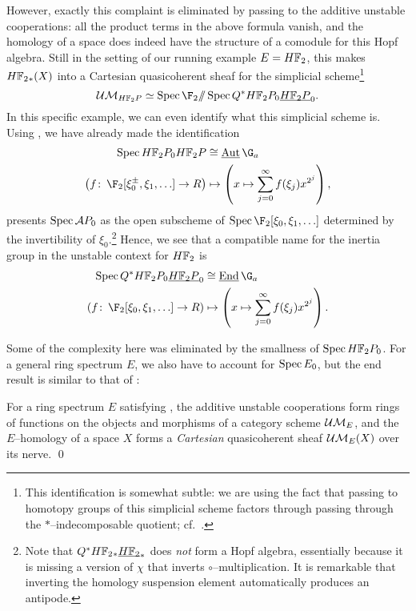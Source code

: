 However, exactly this complaint is eliminated by passing to the additive unstable cooperations: all the product terms in the above formula vanish, and the homology of a space does indeed have the structure of a comodule for this Hopf algebra.  Still in the setting of our running example \(E = \HFtwo\), this makes \(\HFtwo_*(X)\) into a Cartesian quasicoherent sheaf for the simplicial scheme\footnote{This identification is somewhat subtle: we are using the fact that passing to homotopy groups of this simplicial scheme factors through passing through the \(\ast\)--indecomposable quotient; cf.\ .} \[\Ucontext{\HFtwo P} \simeq \Spec \F_2 \mmod \Spec Q^* \HFtwo P_0 \OS{\HFtwo P}{0}.\]  In this specific example, we can even identify what this simplicial scheme is.  Using , we have already made the identification
\begin{align*}
\Spec \HFtwo P_0 \HFtwo P & \cong \InternalAut{\G_a} \\
\left(f\co \F_2[\xi_0^\pm, \xi_1, \ldots] \to R \right) & \mapsto \left(x \mapsto \sum_{j=0}^\infty f(\xi_j) x^{2^j}\right),
\end{align*}
 presents \(\operatorname{Spec} \mathcal A P_0\) as the open subscheme of \(\Spec \F_2[\xi_0, \xi_1, \ldots]\) determined by the invertibility of \(\xi_0\).\footnote{Note that \(Q^* \HFtwo_* \OS{\HFtwo}{*}\) does \emph{not} form a Hopf algebra, essentially because it is missing a version of \(\chi\) that inverts \(\circ\)--multiplication.  It is remarkable that inverting the homology suspension element automatically produces an antipode.}  Hence, we see that a compatible name for the inertia group in the unstable context for \(\HFtwo\) is
\begin{align*}
\Spec Q^* \HFtwo P_0 \OS{\HFtwo P}{0} & \cong \InternalEnd{\G_a} \\
\left(f\co \F_2[\xi_0, \xi_1, \ldots] \to R \right) & \mapsto \left(x \mapsto \sum_{j=0}^\infty f(\xi_j) x^{2^j}\right).
\end{align*}

Some of the complexity here was eliminated by the smallness of \(\Spec \HFtwo P_0\).  For a general ring spectrum \(E\), we also have to account for \(\operatorname{Spec} E_0\), but the end result is similar to that of :
\begin{lemma}
For a ring spectrum \(E\) satisfying {\UFH}, the additive unstable cooperations form rings of functions on the objects and morphisms of a category scheme \(\mathcal{UM}_{E}\), and the \(E\)--homology of a space \(X\) forms a \emph{Cartesian} quasicoherent sheaf \(\mathcal{UM}_{E}(X)\) over its nerve. \qed
\end{lemma}

